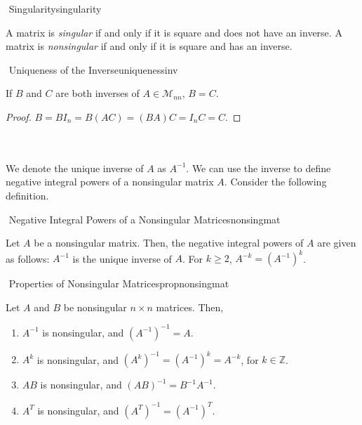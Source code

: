         \begin{definition}{\Stop\,\,Singularity}{singularity}

            A matrix is \textit{singular} if and only if it is square and does not have an inverse. A matrix is \textit{nonsingular} if and only if it is square and has an inverse.
            
        \end{definition}
        \begin{theorem}{\Stop\,\,Uniqueness of the Inverse}{uniquenessinv}

            If \(B\) and \(C\) are both inverses of \(A\in\mathcal{M}_{nn}\), \(B=C\).
            \begin{proof}
                    \(B=BI_n=B(AC)=(BA)C=I_nC=C\).
             \end{proof}
            
        \end{theorem}
        \vphantom
        \\
        \\
        We denote the unique inverse of \(A\) as \(A^{-1}\). We can use the inverse to define negative integral powers of a nonsingular matrix \(A\). Consider the following definition.
        \begin{definition}{\Stop\,\,Negative Integral Powers of a Nonsingular Matrices}{nonsingmat}

            Let \(A\) be a nonsingular matrix. Then, the negative integral powers of \(A\) are given as follows: \(A^{-1}\) is the unique inverse of \(A\). For \(k\geq2\), \(A^{-k}=(A^{-1})^k\).
            
        \end{definition}
        \begin{theorem}{\Stop\,\,Properties of Nonsingular Matrices}{propnonsingmat}

            Let \(A\) and \(B\) be nonsingular \(n\times n\) matrices. Then,
            \begin{enumerate}
                \item \(A^{-1}\) is nonsingular, and \((A^{-1})^{-1}=A\).
                \item \(A^k\) is nonsingular, and \((A^k)^{-1}=(A^{-1})^k=A^{-k}\), for \(k\in\mathbb{Z}\).
                \item \(AB\) is nonsingular, and \((AB)^{-1}=B^{-1}A^{-1}\).
                \item \(A^T\) is nonsingular, and \((A^T)^{-1}=(A^{-1})^T\).
            \end{enumerate}
            
        \end{theorem}